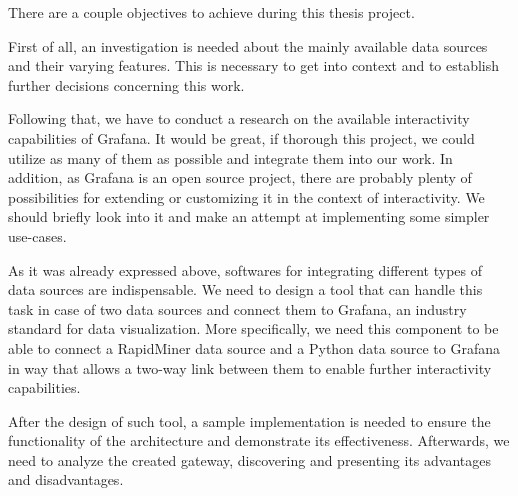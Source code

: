 

There are a couple objectives to achieve during this thesis project.

First of all, an investigation is needed about the mainly available data sources and their varying features. This is necessary to get into context and to establish further decisions concerning this work.

Following that, we have to conduct a research on the available interactivity capabilities of Grafana. It would be great, if thorough this project, we could utilize as many of them as possible and integrate them into our work. In addition, as Grafana is an open source project, there are probably plenty of possibilities for extending or customizing it in the context of interactivity. We should briefly look into it and make an attempt at implementing some simpler use-cases.

As it was already expressed above, softwares for integrating different types of data sources are indispensable. We need to design a tool that can handle this task in case of two data sources and connect them to Grafana, an industry standard for data visualization. More specifically, we need this component to be able to connect a RapidMiner data source and a Python data source to Grafana in way that allows a two-way link between them to enable further interactivity capabilities.

After the design of such tool, a sample implementation is needed to ensure the functionality of the architecture and demonstrate its effectiveness. Afterwards, we need to analyze the created gateway, discovering and presenting its advantages and disadvantages.







